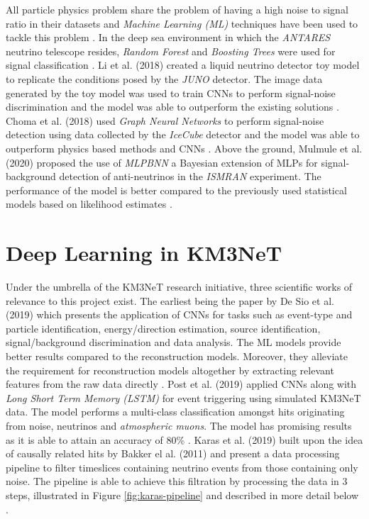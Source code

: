 All particle physics problem share the problem of having a high noise
to signal ratio in their datasets and \emph{Machine Learning (ML)}
techniques have been used to tackle this problem
\cite{mulmule2020machine, li2018deep, choma2018graph, neff2012signal}.
In the deep sea environment in which the \emph{ANTARES} neutrino
telescope resides, \emph{Random Forest} and \emph{Boosting Trees} were
used for signal classification \cite{neff2012signal}. Li et al. (2018)
created a liquid neutrino detector toy model to replicate the
conditions posed by the \emph{JUNO} detector. The image data generated
by the toy model was used to train CNNs to perform signal-noise
discrimination and the model was able to outperform the existing
solutions \cite{li2018deep}. Choma et al. (2018) used \emph{Graph
Neural Networks} to perform signal-noise detection using data
collected by the \emph{IceCube} detector and the model was able to
outperform physics based methods and CNNs \cite{choma2018graph}. Above
the ground, Mulmule et al. (2020) proposed the use of \emph{MLPBNN} a
Bayesian extension of MLPs for signal-background detection of
anti-neutrinos in the \emph{ISMRAN} experiment. The performance of the
model is better compared to the previously used statistical models
based on likelihood estimates \cite{mulmule2020machine}.

\section{Deep Learning in KM3NeT}
\label{sec:dl-km3net}

Under the umbrella of the KM3NeT research initiative, three scientific
works of relevance to this project exist. The earliest being the paper
by De Sio et al. (2019) which presents the application of CNNs for
tasks such as event-type and particle identification, energy/direction
estimation, source identification, signal/background discrimination
and data analysis. The ML models provide better results compared to
the reconstruction models. Moreover, they alleviate the requirement
for reconstruction models altogether by extracting relevant features
from the raw data directly \cite{de2019machine}. Post et al. (2019)
applied CNNs along with \emph{Long Short Term Memory (LSTM)}
\cite{sainath2015convolutional} for event triggering using simulated
KM3NeT data. The model performs a multi-class classification amongst
hits originating from noise, neutrinos and \emph{atmospheric muons}.
The model has promising results as it is able to attain an accuracy of
80\% \cite{post2019km3nnet}. Karas et al. (2019) built upon the idea
of causally related hits by Bakker el al. (2011) and present a data
processing pipeline to filter timeslices containing neutrino events
from those containing only noise. The pipeline is able to achieve this
filtration by processing the data in 3 steps, illustrated in Figure
\ref{fig:karas-pipeline} and described in more detail below
\cite{karas2019data}.

